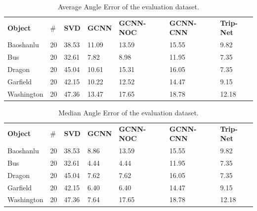 \documentclass[border=15pt, multi, tikz]{article}
\newcommand{\tabhead}[1]{\textbf{#1}}
\begin{document}
\begin{table}[H]
	
	\centering
	\begin{tabular}{l l l l l l l }
		\tabhead{Object} & $ \# $ & \tabhead{SVD} & \tabhead{GCNN} & \tabhead{GCNN-NOC} & \tabhead{GCNN-CNN} & \tabhead{Trip-Net}\\
		Baoshanlu  		& 20 & 38.53  &11.09 & 13.59 & 15.55 & 9.82\\ 
		\hline
		Bus 			& 20 & 32.61  & 7.82 & 8.98 & 11.95 & 7.35\\ 
		\hline
		Dragon  		& 20 & 45.04& 10.61 & 15.31 & 16.05 & 7.35\\
		\hline
		Garfield 		& 20 & 42.15& 10.22 & 12.52 & 14.47 & 9.15\\
		\hline
		Washington 		& 20 & 47.36 & 13.47 & 17.65 & 18.78 & 12.18\\
	\end{tabular}
	\caption{Average Angle Error of the evaluation dataset.}	
	\label{tab:gcnn-eval-mean}
\end{table}



\begin{table}[H]
	
	\centering
	\begin{tabular}{l l l l l l l }
		\tabhead{Object} & $ \# $ & \tabhead{SVD} & \tabhead{GCNN} & \tabhead{GCNN-NOC} & \tabhead{GCNN-CNN} & \tabhead{Trip-Net}\\
		Baoshanlu  		& 20 & 38.53  &8.86 & 13.59 & 15.55 & 9.82\\ 
		\hline
		Bus 			& 20 & 32.61  & 4.44 & 4.44 & 11.95 & 7.35\\ 
		\hline
		Dragon	 		& 20 & 45.04 & 7.62 & 7.62 & 16.05 & 7.35\\
		\hline
		Garfield 		& 20 & 42.15 & 6.40 & 6.40 & 14.47 & 9.15\\
		\hline
		Washington 		& 20 & 47.36 & 7.64 & 17.65 & 18.78 & 12.18\\
	\end{tabular}
	\caption{Median Angle Error of the evaluation dataset.}	
	\label{tab:gcnn-eval-median}
\end{table}
\end{document}
